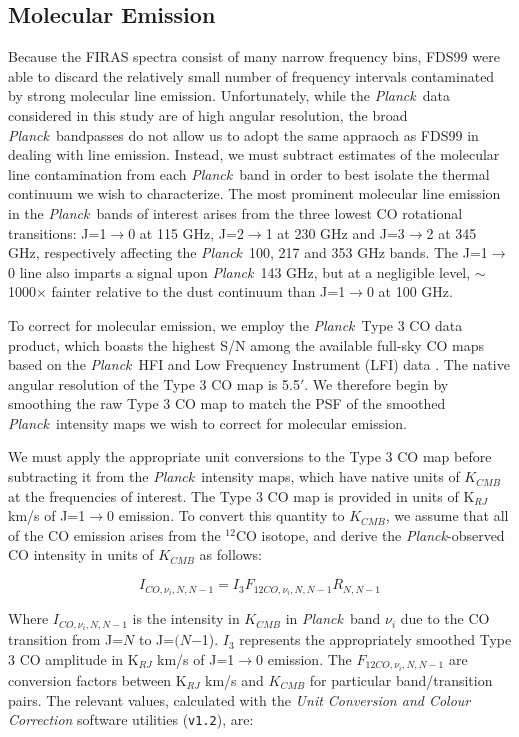 \documentclass{emulateapj}
\newcommand{\PLANCK}{{\it Planck}}
\begin{document}
\subsection{Molecular Emission}
Because the FIRAS spectra consist of many narrow frequency bins, FDS99 were
able to discard the relatively small number of frequency intervals contaminated
by strong molecular line emission. Unfortunately, while the \PLANCK~data 
considered in this study are of high angular resolution, the broad 
\PLANCK~bandpasses do not allow us to adopt the same appraoch as FDS99 in 
dealing with line emission. Instead, we must subtract estimates of the 
molecular line contamination from each \PLANCK~band in order to best isolate 
the thermal continuum we wish to characterize. The most prominent molecular 
line emission in the \PLANCK~bands of interest arises from the three lowest CO 
rotational transitions: J=1$\rightarrow$0 at 115 GHz, J=2$\rightarrow$1 at 230 
GHz and J=3$\rightarrow$2 at 345 GHz, respectively affecting the \PLANCK~100, 
217 and 353 GHz bands. The J=1$\rightarrow$0 line also imparts a signal upon 
\PLANCK~143 GHz, but at a negligible level, $\sim$1000$\times$ fainter relative
to the dust continuum than J=1$\rightarrow$0 at 100 GHz.

To correct for molecular emission, we employ the \PLANCK~Type 3 CO data 
product, which boasts the highest S/N among the available full-sky CO maps 
based on the \PLANCK~HFI and Low Frequency Instrument (LFI) data 
\citep{planckco}. The native angular resolution of the Type 3 CO map is 5.5$'$.
We therefore begin by smoothing the raw Type 3 CO map to match the PSF of the 
smoothed \PLANCK~intensity maps we wish to correct for molecular emission.

We must apply the appropriate unit conversions to the Type 3 CO map before 
subtracting it from the \PLANCK~intensity maps, which have native units of 
$K_{CMB}$ at the frequencies of interest. The Type 3 CO map is provided in 
units of K$_{RJ}$ km/s of J=1$\rightarrow$0 emission. To convert this quantity 
to $K_{CMB}$, we assume that all of the CO emission arises from the $^{12}$CO 
isotope, and derive the \PLANCK-observed CO intensity in units of $K_{CMB}$ as
follows:

\begin{equation}
I_{CO, \nu_i, N, N-1} = I_{3}F_{12CO, \nu_i, N, N-1} R_{N, N-1}
\end{equation}

Where $I_{CO, \nu_i, N, N-1}$ is the intensity in $K_{CMB}$ in \PLANCK~band 
$\nu_i$ due to the CO transition from J=$N$ to J=$(N$$-$1). $I_3$ represents 
the appropriately smoothed Type 3 CO amplitude in  K$_{RJ}$ km/s of 
J=1$\rightarrow$0 emission. The $F_{12CO, \nu_i, N, N-1}$ are conversion 
factors between K$_{RJ}$ km/s and $K_{CMB}$ for particular band/transition 
pairs. The relevant values, calculated with the \textit{Unit Conversion and 
Colour Correction} software utilities (\verb|v1.2|), are:
\end{document}
